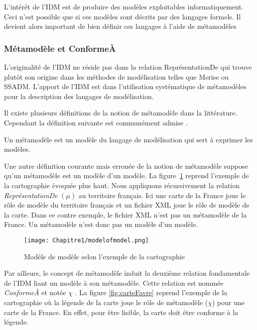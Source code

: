 L'intérêt de l'IDM est de produire des modèles exploitables informatiquement. Ceci n'est possible que si ces modèles sont décrits par des langages formels. Il devient alors important de bien définir ces langages à l'aide de métamodèles

\subsubsection{Métamodèle et ConformeÀ}
L'originalité de l'IDM ne réside pas dans la relation ReprésentationDe qui trouve plutôt son origine dans les méthodes de modélisation telles que Merise ou SSADM. L'apport de l'IDM est dans l'utilisation systématique de métamodèles pour la description des langages de modélisation. 

Il existe plusieurs définitions de la notion de métamodèle dans la littérature. Cependant la définition suivante est communément admise \cite{bezivin2004rapport}.

\begin{theorem}
Un métamodèle est un modèle du langage de modélisation qui sert à exprimer les modèles.
\end{theorem}
Une autre définition courante mais erronée de la notion de métamodèle suppose qu'un métamodèle est un modèle d'un modèle. La figure~\ref{fig:modelofmodel} reprend l'exemple de la cartographie évoquée plus haut. Nous appliquons récursivement la relation \textit{ReprésentationDe} $(\mu)$ au territoire français. Ici une carte de la France joue le rôle de modèle du territoire français et un fichier XML joue le rôle de modèle de la carte. Dans ce contre exemple, le fichier XML n'est pas un métamodèle de la France. Un métamodèle n'est donc pas un modèle d'un modèle.

\begin{figure}[!htbp]
 \begin{center}
  \texttt{[image: Chapitre1/modelofmodel.png]}
 \end{center}
 \caption{Modèle de modèle selon l'exemple de la cartographie \protect\cite{favre2006ingenierie}}
 \label{fig:modelofmodel}
\end{figure}

Par ailleurs, le concept de métamodèle induit la deuxième relation fondamentale de l'IDM liant un modèle à son métamodèle. Cette relation est nommée \textit{ConformeÀ} et notée $\chi$ \cite{bezivin2004search} \cite{favre2004towards}. La figure \ref{fig:carteFavre} reprend l'exemple de la cartographie où la légende de la carte joue le rôle de métamodèle ($\chi$) pour une carte de la France. En effet, pour être lisible, la carte doit être conforme à la légende.

